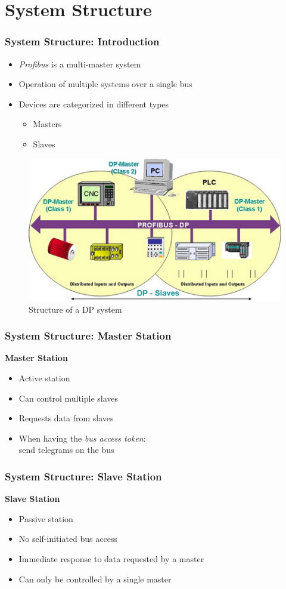 \documentclass{beamer}
\begin{document}
\section{System Structure}
\begin{frame}
  \frametitle{System Structure: Introduction}
  \begin{itemize}
    \item \textit{Profibus} is a multi-master system
    \item Operation of multiple systems over a single bus
    \item Devices are categorized in different types
      \begin{itemize}
        \item Masters
        \item Slaves
      \end{itemize}
  \end{itemize}
  \vspace{-30pt}
      \center
      \begin{figure}
        \includegraphics[width=.55\textwidth]{img/dp_system.png}
        \caption{Structure of a DP system~\cite{profibusmanual}}
      \end{figure}
\end{frame}

\begin{frame}
  \frametitle{System Structure: Master Station}
  \textbf{Master Station}
  \begin{itemize}
    \item Active station
    \item Can control multiple slaves
    \item Requests data from slaves
    \item When having the \textit{bus access token}: \\
      send telegrams on the bus
  \end{itemize}
\end{frame}

\begin{frame}
  \frametitle{System Structure: Slave Station}
  \textbf{Slave Station}
  \begin{itemize}
    \item Passive station
    \item No self-initiated bus access
    \item Immediate response to data requested by a master
    \item Can only be controlled by a single master
  \end{itemize}
\end{frame}
\end{document}
